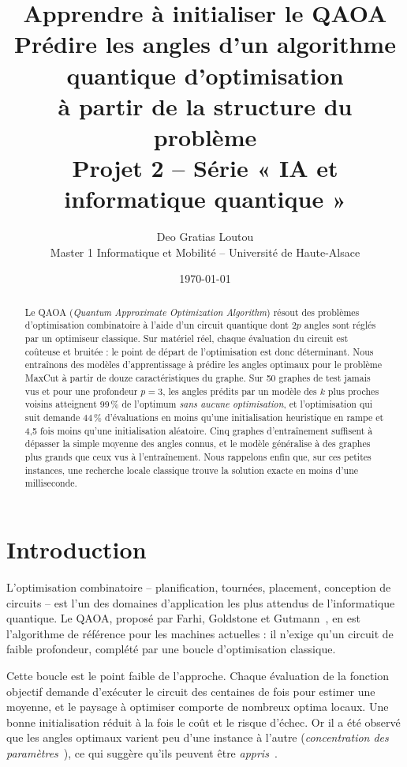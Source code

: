\documentclass[11pt,a4paper]{article}
\title{\textbf{Apprendre à initialiser le QAOA}\\[0.3em]
\large Prédire les angles d'un algorithme quantique d'optimisation\\ à partir de la structure du problème\\[0.3em]
\normalsize Projet 2 -- Série « IA et informatique quantique »}
\author{Deo Gratias Loutou\\ Master 1 Informatique et Mobilité -- Université de Haute-Alsace}
\date{\today}
\begin{document}
\maketitle

\begin{abstract}
Le QAOA (\emph{Quantum Approximate Optimization Algorithm}) résout des problèmes d'optimisation
combinatoire à l'aide d'un circuit quantique dont $2p$ angles sont réglés par un optimiseur classique.
Sur matériel réel, chaque évaluation du circuit est coûteuse et bruitée : le point de départ de
l'optimisation est donc déterminant. Nous entraînons des modèles d'apprentissage à prédire les angles
optimaux pour le problème MaxCut à partir de douze caractéristiques du graphe. Sur 50 graphes de test
jamais vus et pour une profondeur $p=3$, les angles prédits par un modèle des $k$ plus proches voisins
atteignent 99\,\% de l'optimum \emph{sans aucune optimisation}, et l'optimisation qui suit demande
44\,\% d'évaluations en moins qu'une initialisation heuristique en rampe et 4,5 fois moins qu'une
initialisation aléatoire. Cinq graphes d'entraînement suffisent à dépasser la simple moyenne des angles
connus, et le modèle généralise à des graphes plus grands que ceux vus à l'entraînement. Nous
rappelons enfin que, sur ces petites instances, une recherche locale classique trouve la solution
exacte en moins d'une milliseconde.
\end{abstract}

\tableofcontents
\newpage

\section{Introduction}

L'optimisation combinatoire -- planification, tournées, placement, conception de circuits -- est l'un des
domaines d'application les plus attendus de l'informatique quantique. Le QAOA, proposé par Farhi,
Goldstone et Gutmann~\cite{farhi2014}, en est l'algorithme de référence pour les machines actuelles :
il n'exige qu'un circuit de faible profondeur, complété par une boucle d'optimisation classique.

Cette boucle est le point faible de l'approche. Chaque évaluation de la fonction objectif demande
d'exécuter le circuit des centaines de fois pour estimer une moyenne, et le paysage à optimiser
comporte de nombreux optima locaux. Une bonne initialisation réduit à la fois le coût et le risque
d'échec. Or il a été observé que les angles optimaux varient peu d'une instance à l'autre
(\emph{concentration des paramètres}~\cite{brandao2018,zhou2020}), ce qui suggère qu'ils peuvent être
\emph{appris}~\cite{khairy2020}.
\end{document}
